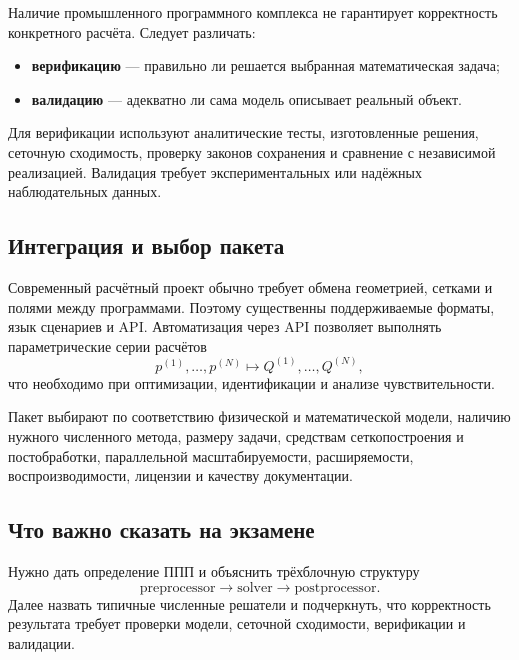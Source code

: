 Наличие промышленного программного комплекса не гарантирует корректность конкретного расчёта. Следует различать:
\begin{itemize}
\item \textbf{верификацию} --- правильно ли решается выбранная математическая задача;
\item \textbf{валидацию} --- адекватно ли сама модель описывает реальный объект.
\end{itemize}

Для верификации используют аналитические тесты, изготовленные решения, сеточную сходимость, проверку законов сохранения и сравнение с независимой реализацией. Валидация требует экспериментальных или надёжных наблюдательных данных.

\subsection{Интеграция и выбор пакета}

Современный расчётный проект обычно требует обмена геометрией, сетками и полями между программами. Поэтому существенны поддерживаемые форматы, язык сценариев и API. Автоматизация через API позволяет выполнять параметрические серии расчётов
\[
p^{(1)},\ldots,p^{(N)}
\longmapsto
Q^{(1)},\ldots,Q^{(N)},
\]
что необходимо при оптимизации, идентификации и анализе чувствительности.

Пакет выбирают по соответствию физической и математической модели, наличию нужного численного метода, размеру задачи, средствам сеткопостроения и постобработки, параллельной масштабируемости, расширяемости, воспроизводимости, лицензии и качеству документации.

\subsection{Что важно сказать на экзамене}

Нужно дать определение ППП и объяснить трёхблочную структуру
\[
\boxed{\text{preprocessor}\rightarrow\text{solver}\rightarrow\text{postprocessor}}.
\]
Далее назвать типичные численные решатели и подчеркнуть, что корректность результата требует проверки модели, сеточной сходимости, верификации и валидации.

\newpage
